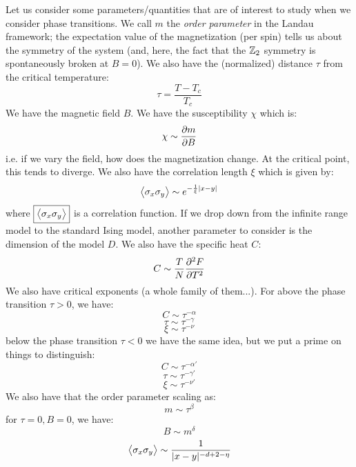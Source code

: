 Let us consider some parameters/quantities that are of interest to study when we consider phase transitions. We call $\boxed{m}$ the \emph{order parameter} in the Landau framework; the expectation value of the magnetization (per spin) tells us about the symmetry of the system (and, here, the fact that the $\mathbb{Z}_2$ symmetry is spontaneously broken at $B = 0$). We also have the (normalized) distance $\boxed{\tau}$ from the critical temperature:
\begin{equation}
    \tau = \frac{T - T_c}{T_c}
\end{equation}
We have the magnetic field $\boxed{B}$. We have the susceptibility $\boxed{\chi}$ which is:
\begin{equation}
    \chi \sim \frac{\partial m}{\partial B}
\end{equation}
i.e. if we vary the field, how does the magnetization change. At the critical point, this tends to diverge. We also have the correlation length $\boxed{\xi}$ which is given by:
\begin{equation}
    \left< \sigma_x \sigma_y \right> \sim e^{-\frac{1}{\xi}\lvert x - y \rvert}
\end{equation}
where $\boxed{\left< \sigma_x \sigma_y \right>}$ is a correlation function. If we drop down from the infinite range model to the standard Ising model, another parameter to consider is the dimension of the model $\boxed{D}$. We also have the specific heat $\boxed{C}$:
\begin{equation}
    C \sim \frac{T}{N}\frac{\partial ^2F}{\partial T^2}
\end{equation} 
We also have critical exponents (a whole family of them...). For above the phase transition $\tau > 0$, we have:
\begin{equation}
    C \sim \tau^{-\alpha}
\end{equation}
\begin{equation}
    \tau \sim \tau^{-\gamma}
\end{equation}
\begin{equation}
    \xi \sim \tau^{-\nu}
\end{equation}
below the phase transition $\tau < 0$ we have the same idea, but we put a prime on things to distinguish:
\begin{equation}
    C \sim \tau^{-\alpha'}
\end{equation}
\begin{equation}
    \tau \sim \tau^{-\gamma'}
\end{equation}
\begin{equation}
    \xi \sim \tau^{-\nu'}
\end{equation}
We also have that the order parameter scaling as:
\begin{equation}
    m \sim \tau^{\beta}
\end{equation}
for $\tau = 0, B = 0$, we have:
\begin{equation}
    B \sim m^\delta
\end{equation}
\begin{equation}
    \left< \sigma_x\sigma_y \right> \sim \frac{1}{\lvert x - y \rvert^{-d + 2 - \eta}}
\end{equation}

